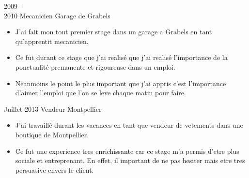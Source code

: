 \documentclass[letterpaper]{cv} %
\begin{document}
\begin{twenty} %
	\twentyitem
    	{ 2009 - \\ 2010}
        {Mecanicien}
        {Garage de Grabels}
        {
        {\begin{itemize}
        \item J'ai fait mon tout premier stage dans un garage a Grabels en tant qu'apprentit mecanicien.
        \item Ce fut durant ce stage que j'ai realisé que j'ai realisé l'importance de la ponctualité premanente et rigoureuse dans un emploi.
        \item Neanmoins le point le plus important que j'ai appris c'est l'importance d'aimer l'emploi que l'on se leve chaque matin pour faire.
    \end{itemize}}
        }

    \twentyitem
   		{Juillet 2013}
        {Vendeur}
        {{Montpellier}}
        {}
        {
        {\begin{itemize}
        \item J'ai travaillé durant les vacances en tant que vendeur de vetements dans une boutique de Montpellier.
        \item Ce fut une experience tres enrichissante car ce stage m'a permis d'etre plus sociale et entreprenant. En effet, il important de ne pas hesiter mais etre tres persuasive envers le client.
    \end{itemize}}
        }

\end{twenty}
\end{document}
